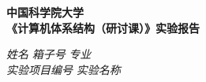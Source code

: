 \begin{center}
  \LARGE \bf 中国科学院大学 \\《计算机体系结构（研讨课）》实验报告
\end{center}

\begin{center}
  \emph{姓名} \underline{\makebox[15em][c]{\name}} 
  \emph{箱子号} \underline{\makebox[5em][c]{\studentNum}}
  \emph{专业} \underline{\makebox[12em][c]{\major}}\\
  \emph{实验项目编号} \underline{\makebox[5em][c]{\labNum}}
  \emph{实验名称} \underline{\makebox[20em][c]{\labName}}\\
\end{center}

  